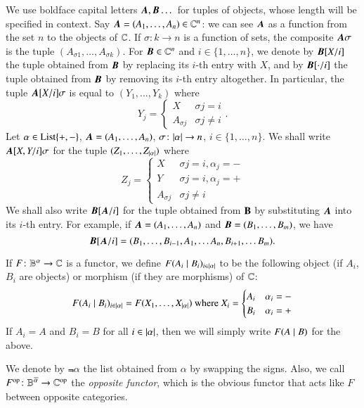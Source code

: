 We use boldface capital letters ${\boldsymbol A},{\boldsymbol B}\dots$ for tuples of objects, whose length will be specified in context. Say ${\boldsymbol A}=(A_1,\dots,A_n) \in \mathbb C^n$: we can see ${\boldsymbol A}$ as a function from the set $n$ to the objects of $\mathbb C$. If $\sigma \colon k \to n$ is a function of sets, the composite ${\boldsymbol A} \sigma$ is the tuple $(A_{\sigma 1}, \dots, A_{\sigma k})$. For ${\boldsymbol B} \in \mathbb C^n$ and $i \in \{1,\dots,n\}$, we denote by ${{\boldsymbol{B}}[X/i}]$ the tuple obtained from ${\boldsymbol B}$ by replacing its $i$-th entry with $X$, and by ${{\boldsymbol{B}}[\cdot/i}]$ the tuple obtained from ${\boldsymbol B}$ by removing its $i$-th entry altogether. In particular, the tuple ${{\boldsymbol{A}}[X/i}] \sigma$ is equal to $(Y_1,\dots,Y_k)$ where
\[
Y_j = \begin{cases}
X & \sigma j=i \\
A_{\sigma j} & \sigma j \ne i
\end{cases}.
\]
Let $\alpha \in \mathrm{List}\{+,-\}$, ${\boldsymbol A} = (A_1,\dots,A_n)$, $\sigma \colon \lvert \alpha \rvert \to n$, $i \in \{1,\dots,n\}$. We shall write ${{\boldsymbol{A}}[X,Y / i]} \sigma$ for the tuple $(Z_1,\dots,Z_{\lvert \alpha \rvert})$ where
\[
Z_j = \begin{cases}
X & \sigma j = i, \alpha_j = - \\
Y & \sigma j = i, \alpha_j = + \\
A_{\sigma j} & \sigma j \ne i
\end{cases}\label{not:A[X,Y/i]sigma}
\]
We shall also write ${{\boldsymbol{B}}[{\boldsymbol A}/i}]$ for the tuple obtained from $\bf B$ by substituting ${\boldsymbol A}$ into its $i$-th entry. For example, if ${\boldsymbol A} = (A_1,\dots,A_n)$ and ${\boldsymbol B} = (B_1,\dots,B_m)$, we have
\[
{{\boldsymbol{B}}[{\boldsymbol A}/i}] = (B_1,\dots, B_{i-1},A_1,\dots A_n, B_{i+1}, \dots B_m).
\]

If $F \colon \mathbb B^{\alpha} \to \mathbb C$ is a functor, we define $F ({A_i} \mid {B_i} )_{i \in \lvert \alpha \rvert}$ to be the following object (if $A_i$, $B_i$ are objects) or morphism (if they are morphisms) of $\mathbb C$:
\[
F ({A_i} \mid {B_i} )_{i \in \lvert \alpha \rvert}= F(X_1,\dots,X_{\lvert \alpha \rvert}) \text{ where } X_i =
\begin{cases}
A_i & \alpha_i = - \\
B_i & \alpha_i = +
\end{cases}
\]
If $A_i = A$ and $B_i = B$ for all $i \in \lvert \alpha \rvert$, then we will simply write $F ( A \mid B )$ for the above.

We denote by $\Not\alpha$ the list obtained from $\alpha$ by swapping the signs. Also, we call $F^{\text{op}} \colon \mathbb B^{\overline{\alpha}} \to \mathbb C^{\text{op}}$ the \emph{opposite functor}, which is the obvious functor that acts like $F$ between opposite categories.
